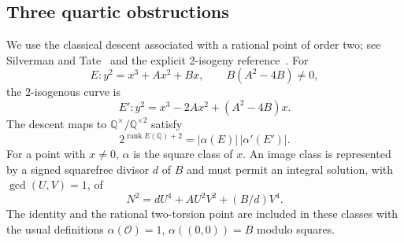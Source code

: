\documentclass[11pt,letterpaper]{article}
\theoremstyle{definition}\newtheorem{definition}[theorem]{Definition}
\theoremstyle{remark}\newtheorem{remark}[theorem]{Remark}
\newcommand{\Q}{\mathbb Q}\newcommand{\Z}{\mathbb Z}\newcommand{\R}{\mathbb R}
\newcommand{\rk}{\operatorname{rank}}\newcommand{\diag}{\operatorname{diag}}
\begin{document}
\subsection{Three quartic obstructions}
We use the classical descent associated with a rational point of order two; see Silverman and Tate~\cite{SilvermanTate} and the explicit 2-isogeny reference~\cite{SageDescent}. For
\[
 E:y^2=x^3+Ax^2+Bx,\qquad B(A^2-4B)\ne0,
\]
the 2-isogenous curve is
\[
 E':y^2=x^3-2Ax^2+(A^2-4B)x.
\]
The descent maps to $\Q^\times/\Q^{\times2}$ satisfy
\begin{equation}\label{eq:descentrank}
 2^{\rk E(\Q)+2}=|\alpha(E)|\,|\alpha'(E')|.
\end{equation}
For a point with $x\ne0$, $\alpha$ is the square class of $x$. An image class is represented by a signed squarefree divisor $d$ of $B$ and must permit an integral solution, with $\gcd(U,V)=1$, of
\begin{equation}\label{eq:cover}
 N^2=dU^4+A U^2V^2+(B/d)V^4.
\end{equation}
The identity and the rational two-torsion point are included in these classes with the usual definitions $\alpha(\mathcal O)=1$, $\alpha((0,0))=B$ modulo squares.
\end{document}
